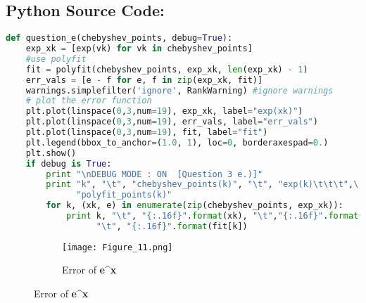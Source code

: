 \documentclass{article}
\begin{document}
\subsection*{Python Source Code:}
\begin{lstlisting}[language=Python]
def question_e(chebyshev_points, debug=True):
    exp_xk = [exp(vk) for vk in chebyshev_points]
    #use polyfit
    fit = polyfit(chebyshev_points, exp_xk, len(exp_xk) - 1)
    err_vals = [e - f for e, f in zip(exp_xk, fit)]
    warnings.simplefilter('ignore', RankWarning) #ignore warnings
    # plot the error function
    plt.plot(linspace(0,3,num=19), exp_xk, label="exp(xk)")
    plt.plot(linspace(0,3,num=19), err_vals, label="err_vals")
    plt.plot(linspace(0,3,num=19), fit, label="fit")
    plt.legend(bbox_to_anchor=(1.0, 1), loc=0, borderaxespad=0.)
    plt.show()
    if debug is True:
        print "\nDEBUG MODE : ON  [Question 3 e.)]"
        print "k", "\t", "chebyshev_points(k)", "\t", "exp(k)\t\t\t",\
              "polyfit_points(k)"
        for k, (xk, e) in enumerate(zip(chebyshev_points, exp_xk)):
            print k, "\t", "{:.16f}".format(xk), "\t","{:.16f}".format(e), \
                  "\t", "{:.16f}".format(fit[k])
\end{lstlisting}

\begin{figure}[h!]
  \centering
  \begin{subfigure}{\linewidth}
    \texttt{[image: Figure\_11.png]}
    \caption{Error of \textbf{e^x} }
  \end{subfigure}
\end{figure}

\pagebreak
\end{document}
